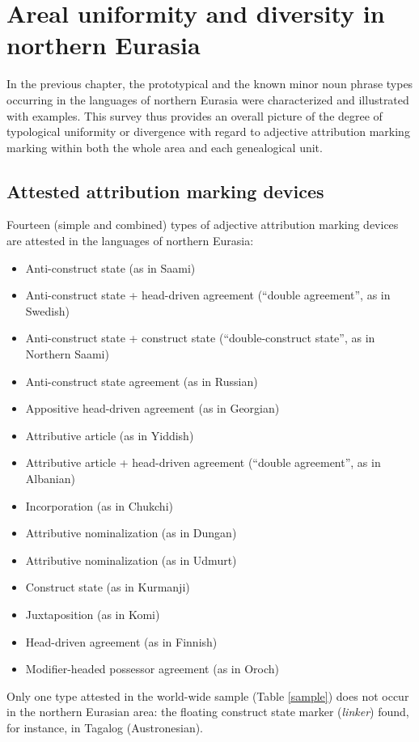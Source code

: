 
\chapter[Areal uniformity and diversity]{Areal uniformity and diversity in northern Eurasia}\label{areality}
In the previous chapter, the prototypical and the known minor noun phrase types occurring in the languages of northern Eurasia were characterized and illustrated with examples. This survey thus provides an overall picture of the degree of typological uniformity or divergence with regard to adjective attribution marking marking within both the whole area and each genealogical unit.

\section{Attested attribution marking devices}
Fourteen (simple and combined) types of adjective attribution marking devices are attested in the languages of northern Eurasia:
\begin{itemize}
\item Anti-construct state (as in Saami)
\item Anti-construct state + head-driven agreement (“double agreement”, as in Swedish)
\item Anti-construct state + construct state (“double-construct state”, as in Northern Saami)
\item Anti-construct state agreement (as in Russian)
\item Appositive head-driven agreement (as in Georgian)
\item Attributive article (as in Yiddish)
\item Attributive article + head-driven agreement (“double agreement”, as in Albanian)
\item Incorporation (as in Chukchi)
\item Attributive nominalization (as in Dungan)
\item Attributive nominalization (as in Udmurt)
\item Construct state (as in Kurmanji)
\item Juxtaposition (as in Komi)
\item Head-driven agreement (as in Finnish)
\item Modifier-headed possessor agreement (as in Oroch)
\end{itemize}
Only one type attested in the world-wide sample (Table \ref{sample}) does not occur in the northern Eurasian area: the floating construct state marker ({\it linker}) found, for instance, in Tagalog (Austronesian). 

